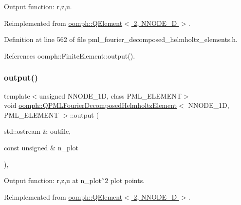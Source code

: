 Output function\+: r,z,u. 



Reimplemented from \hyperlink{classoomph_1_1QElement_3_012_00_01NNODE__1D_01_4_ab7bb815a43598e7ce0c4d10c511504fc}{oomph\+::\+Q\+Element$<$ 2, N\+N\+O\+D\+E\+\_\+D $>$}.



Definition at line 562 of file pml\+\_\+fourier\+\_\+decomposed\+\_\+helmholtz\+\_\+elements.\+h.



References oomph\+::\+Finite\+Element\+::output().

\mbox{\label{classoomph_1_1QPMLFourierDecomposedHelmholtzElement_afc5cf87a0704c5a139abdbd2bdf56e85}} 
\subsubsection{\texorpdfstring{output()}{output()}\hspace{0.1cm}{\footnotesize\ttfamily [2/4]}}
{\footnotesize\ttfamily template$<$unsigned N\+N\+O\+D\+E\+\_\+1D, class P\+M\+L\+\_\+\+E\+L\+E\+M\+E\+NT$>$ \\
void \hyperlink{classoomph_1_1QPMLFourierDecomposedHelmholtzElement}{oomph\+::\+Q\+P\+M\+L\+Fourier\+Decomposed\+Helmholtz\+Element}$<$ N\+N\+O\+D\+E\+\_\+1D, P\+M\+L\+\_\+\+E\+L\+E\+M\+E\+NT $>$\+::output (\begin{DoxyParamCaption}\item[{std\+::ostream \&}]{outfile,  }\item[{const unsigned \&}]{n\+\_\+plot }\end{DoxyParamCaption})\hspace{0.3cm}{\ttfamily [inline]}, {\ttfamily [virtual]}}



Output function\+: r,z,u at n\+\_\+plot$^\wedge$2 plot points. 



Reimplemented from \hyperlink{classoomph_1_1QElement_3_012_00_01NNODE__1D_01_4_a865e3a77ee4cb67e7fcd7eca42d256f1}{oomph\+::\+Q\+Element$<$ 2, N\+N\+O\+D\+E\+\_\+D $>$}.



